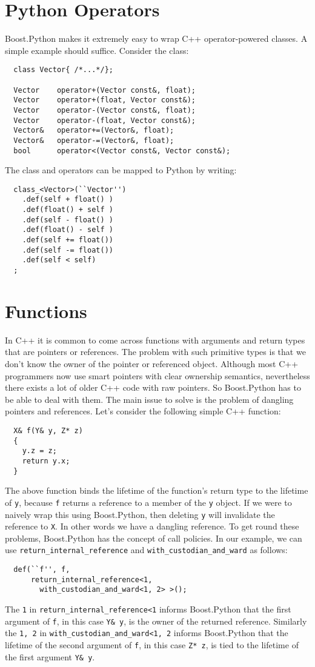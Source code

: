 \section{Python Operators}
Boost.Python makes it extremely easy to wrap C++ operator-powered classes. A simple example should suffice. Consider the class:
\begin{verbatim}
  class Vector{ /*...*/};

  Vector    operator+(Vector const&, float);
  Vector    operator+(float, Vector const&);
  Vector    operator-(Vector const&, float);
  Vector    operator-(float, Vector const&);
  Vector&   operator+=(Vector&, float);
  Vector&   operator-=(Vector&, float);
  bool      operator<(Vector const&, Vector const&);
\end{verbatim}
The class and operators can be mapped to Python by writing:
\begin{verbatim}
  class_<Vector>(``Vector'')
    .def(self + float() )
    .def(float() + self )
    .def(self - float() )
    .def(float() - self )
    .def(self += float())
    .def(self -= float())
    .def(self < self)
  ;
\end{verbatim}

\section{Functions}
In C++ it is common to come across functions with arguments and return types that are pointers or references. The problem with such primitive types is that we don't know the owner of the pointer or referenced object. Although most C++ programmers now use smart pointers with clear ownership semantics, nevertheless there exists a lot of older C++ code with raw pointers. So Boost.Python has to be able to deal with them. The main issue to solve is the problem of dangling pointers and references. Let's consider the following simple C++ function:
\begin{verbatim}
  X& f(Y& y, Z* z)
  {
    y.z = z;
    return y.x;
  }
\end{verbatim} 
The above function binds the lifetime of the function's return type to the lifetime of \verb|y|, because \verb|f| returns a reference to a member of the \verb|y| object. If we were to naively wrap this using Boost.Python, then deleting \verb|y| will invalidate the reference to \verb|X|. In other words we have a dangling reference. To get round these problems, Boost.Python has the concept of call policies. In our example, we can use \verb|return_internal_reference| and \verb|with_custodian_and_ward| as follows:
\begin{verbatim}
  def(``f'', f,
      return_internal_reference<1,
        with_custodian_and_ward<1, 2> >();
\end{verbatim}  
The \verb|1| in \verb|return_internal_reference<1| informs Boost.Python that the first argument of \verb|f|, in this case \verb|Y& y|, is the owner of the returned reference. Similarly the \verb|1, 2| in \verb|with_custodian_and_ward<1, 2| informs Boost.Python that the lifetime of the second argument of \verb|f|, in this case \verb|Z* z|, is tied to the lifetime of the first argument \verb|Y& y|.


